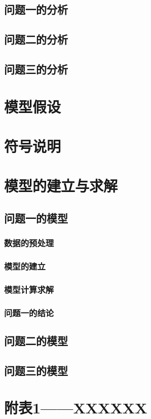 \documentclass[]{article}
\begin{document}
\subsection{问题一的分析}

\subsection{问题二的分析}

\subsection{问题三的分析}

\section{模型假设}
\section{符号说明}
\section{模型的建立与求解}

\newpage
\subsection{问题一的模型}
\subsubsection{数据的预处理}
\subsubsection{模型的建立}
\subsubsection{模型计算求解}
\subsubsection{问题一的结论}

\newpage
\subsection{问题二的模型}
\subsection{问题三的模型}

	\appendix 
\renewcommand{\appendixname}{Appendix~\Alph{section}}
\section{附表1——XXXXXX}
\end{document}
